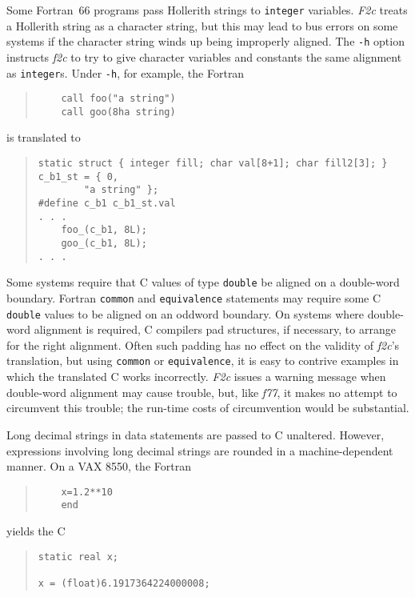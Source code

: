 \documentclass[12pt]{article}
\begin{document}
Some Fortran~66 programs pass Hollerith strings to \verb|integer| variables. \emph{F2c} treats a Hollerith string as a character string, but this may lead to bus errors on some systems if the character string winds up being improperly aligned. The \verb|-h| option instructs \emph{f2c} to try to give character variables and constants the same alignment as \verb|integer|s. Under \verb|-h|, for example, the Fortran
\begin{quote}
\begin{verbatim}
    call foo("a string")
    call goo(8ha string)
\end{verbatim}
\end{quote}
is translated to
\begin{quote}
\begin{verbatim}
static struct { integer fill; char val[8+1]; char fill2[3]; } c_b1_st = { 0,
        "a string" };
#define c_b1 c_b1_st.val
. . .
    foo_(c_b1, 8L);
    goo_(c_b1, 8L);
. . .
\end{verbatim}
\end{quote}

Some systems require that C values of type \verb|double| be aligned on a double-word boundary. Fortran \verb|common| and \verb|equivalence| statements may require some C \verb|double| values to be aligned on an oddword boundary. On systems where double-word alignment is required, C compilers pad structures, if necessary, to arrange for the right alignment. Often such padding has no effect on the validity of \emph{f2c}’s translation, but using \verb|common| or \verb|equivalence|, it is easy to contrive examples in which the translated C works incorrectly. \emph{F2c} issues a warning message when double-word alignment may cause trouble, but, like \emph{f77}, it makes no attempt to circumvent this trouble; the run-time costs of circumvention would be substantial.

Long decimal strings in data statements are passed to C unaltered. However, expressions involving long decimal strings are rounded in a machine-dependent manner. On a VAX 8550, the Fortran
\begin{quote}
\begin{verbatim}
    x=1.2**10
    end
\end{verbatim}
\end{quote}
yields the C
\begin{quote}
\begin{verbatim}
static real x;

x = (float)6.1917364224000008;
\end{verbatim}
\end{quote}
\end{document}
